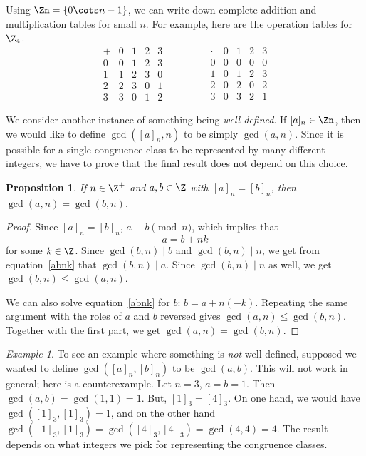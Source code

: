 \documentclass[12pt]{amsart}
\theoremstyle{plain}
\newtheorem{prop}[thm]{Proposition}
\theoremstyle{definition}
\theoremstyle{remark}
\newtheorem*{exam}{Example}
\begin{document}
Using $\Zn=\{0\cots n-1\}$, we can write down complete addition and
multiplication tables for small $n$.  For example, here are the
operation tables for $\Z_4$.
\[
\begin{array}{c|*{4}{|c}}
+ & 0 & 1 & 2 & 3 \\ \hline \hline
0 & 0 & 1 & 2 & 3 \\ \hline
1 & 1 & 2 & 3 & 0 \\ \hline
2 & 2 & 3 & 0 & 1 \\ \hline
3 & 3 & 0 & 1 & 2 
\end{array}
\qquad
\qquad
\begin{array}{c|*{4}{|c}}
\cdot & 0 & 1 & 2 & 3 \\ \hline \hline
0 & 0 & 0 & 0 & 0 \\ \hline
1 & 0 & 1 & 2 & 3 \\ \hline
2 & 0 & 2 & 0 & 2 \\ \hline
3 & 0 & 3 & 2 & 1 
\end{array}
\]

We consider another instance of something being \emph{well-defined}.
If $[a]_n\in\Zn$, then we would like to define $\gcd([a]_n,n)$ to be
simply $\gcd(a,n)$.  Since it is possible for a single congruence
class to be represented by many different integers, we have to prove
that the final result does not depend on this choice.
\begin{prop}
  If $n\in\Z^+$ and $a,b\in\Z$ with $[a]_n=[b]_n$, then
  $\gcd(a,n)=\gcd(b,n)$.
\end{prop}
\begin{proof} \label{gcd-well-def}
  Since $[a]_n=[b]_n$, $a\equiv b\pmod n$, which implies that 
\begin{equation}\label{abnk}
  a=b+nk
\end{equation}
for some $k\in\Z$.  Since $\gcd(b,n)\mid b$ and $\gcd(b,n)\mid n$,
  we get from equation~\ref{abnk} that $\gcd(b,n)\mid a$.  Since
  $\gcd(b,n)\mid n$ as well, we get $\gcd(b,n)\leq \gcd(a,n)$.

  We can also solve equation~\ref{abnk} for $b$: $b=a+n(-k)$.
  Repeating the same argument with the roles of $a$ and $b$ reversed
  gives $\gcd(a,n)\leq \gcd(b,n)$.  Together with the first part, we
  get $\gcd(a,n)=\gcd(b,n)$.
\end{proof}
\begin{exam}
  To see an example where something is \emph{not} well-defined,
  supposed we wanted to define $\gcd([a]_n,[b]_n)$ to be $\gcd(a,b)$.
  This will not work in general; here is a counterexample.  Let $n=3$,
  $a=b=1$.  Then $\gcd(a,b)=\gcd(1,1)=1$.  But, $[1]_3=[4]_3$.  On one
  hand, we would have $\gcd([1]_3,[1]_3)=1$, and on the other hand
  $\gcd([1]_3,[1]_3) = \gcd([4]_3,[4]_3) =\gcd(4,4)=4$.  The result
  depends on what integers we pick for representing the congruence classes.
\end{exam}
\end{document}
